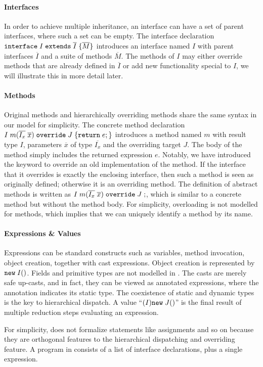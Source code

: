 \paragraph{Interfaces}
In order to achieve multiple inheritance, an interface can have a set of 
parent interfaces, where such a set can be empty. The interface declaration $\texttt{interface} \; I \; \texttt{extends} \; \overline{I} \; {\{} \overline{M} {\}}$ introduces an interface named $I$ with parent interfaces $\overline{I}$ and a suite of methods $\overline{M}$. The methods of $I$ may either override methods that are already defined in $\overline{I}$ or add new functionality special to $I$, we will illustrate this in more detail later.

\paragraph{Methods}
Original methods and hierarchically overriding methods share the same syntax in our model for simplicity.
The concrete method declaration $I \; m (\overline{I_x} \; \overline{x}) \; \texttt{override} \; J \; {\{} \texttt{return} \; e ; {\}}$ introduces a
method named $m$ with result type $I$, parameters $\overline{x}$ of
type $\overline{I_x}$ and the overriding target $J$. The body of the
method simply includes the returned expression $e$. Notably, we have introduced the
\kwoverride{} keyword to override an old implementation of the
method. If the interface that it overrides is exactly the enclosing
interface, then such a method is seen as originally defined; otherwise it is an overriding method. The definition
of abstract methods is written as $I \; m (\overline{I_x} \; \overline{x}) \; \texttt{override} \; J \; ;$, which is
similar to a concrete method but without the method body. 
For simplicity, overloading is not modelled for methods, which
implies that we can uniquely identify a method by its name.

\paragraph{Expressions \& Values}
Expressions can be standard constructs such as variables, method
invocation, object creation, together with cast expressions. 
Object creation is represented by $\texttt{new} \; I()$. Fields and primitive types are not modelled in \MIM{}. 
The casts are merely safe up-casts, and in fact, they can be viewed as
annotated expressions, where the annotation indicates its static type.
The coexistence of static and dynamic types is the key to hierarchical dispatch.
A value
``$(I)\texttt{new} \; J()$''
is the final result of multiple reduction steps evaluating an
expression.

For simplicity, \name{} does not formalize statements like assignments and so on because they are orthogonal features to the hierarchical dispatching and overriding feature.
A program in \name{} consists of a list of interface declarations, plus a single expression.

